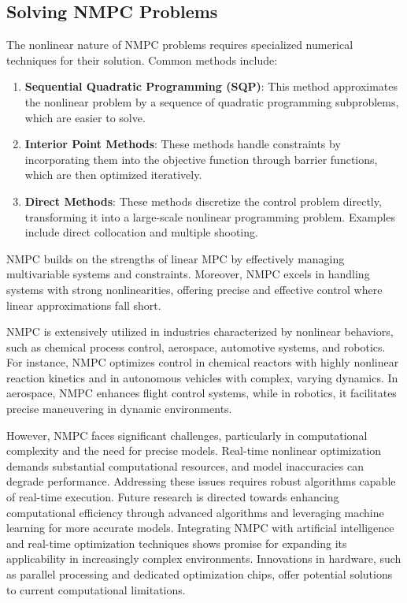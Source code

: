 \subsection*{Solving NMPC Problems}
The nonlinear nature of NMPC problems requires specialized numerical techniques for their solution. Common methods include:
\begin{enumerate}
	\item \textbf{Sequential Quadratic Programming (SQP)}: This method approximates the nonlinear problem by a sequence of quadratic programming subproblems, which are easier to solve.
	\item \textbf{Interior Point Methods}: These methods handle constraints by incorporating them into the objective function through barrier functions, which are then optimized iteratively.
	\item \textbf{Direct Methods}: These methods discretize the control problem directly, transforming it into a large-scale nonlinear programming problem. Examples include direct collocation and multiple shooting.
\end{enumerate}

NMPC builds on the strengths of linear MPC by effectively managing multivariable systems and constraints. Moreover, NMPC excels in handling systems with strong nonlinearities, offering precise and effective control where linear approximations fall short.

NMPC is extensively utilized in industries characterized by nonlinear behaviors, such as chemical process control, aerospace, automotive systems, and robotics. For instance, NMPC optimizes control in chemical reactors with highly nonlinear reaction kinetics and in autonomous vehicles with complex, varying dynamics. In aerospace, NMPC enhances flight control systems, while in robotics, it facilitates precise maneuvering in dynamic environments.

However, NMPC faces significant challenges, particularly in computational complexity and the need for precise models. Real-time nonlinear optimization demands substantial computational resources, and model inaccuracies can degrade performance. Addressing these issues requires robust algorithms capable of real-time execution. Future research is directed towards enhancing computational efficiency through advanced algorithms and leveraging machine learning for more accurate models. Integrating NMPC with artificial intelligence and real-time optimization techniques shows promise for expanding its applicability in increasingly complex environments. Innovations in hardware, such as parallel processing and dedicated optimization chips, offer potential solutions to current computational limitations.

